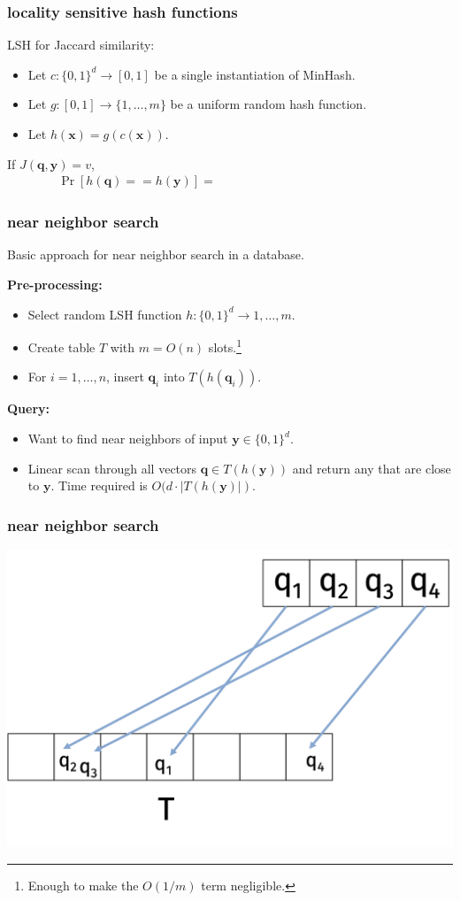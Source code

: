 \documentclass[compress]{beamer}
\newcommand{\bv}[1]{\mathbf{#1}}
\begin{document}
\begin{frame}
	\frametitle{locality sensitive hash functions}
	LSH for Jaccard similarity:
	\begin{itemize}
		\item Let $c: \{0,1\}^d \rightarrow [0,1]$ be a single instantiation of MinHash.
		\item Let $g: [0,1] \rightarrow \{1, \ldots, m\}$ be a uniform random hash function.
		\item Let $h(\bv{x}) = g(c(\bv{x})).$
	\end{itemize}
		If $J(\bv{q},\bv{y}) = v$, 
		\begin{align*}
			\Pr\left[h(\bv{q}) == h(\bv{y})\right] = \hspace{15em}
		\end{align*}
\end{frame}

\begin{frame}
	\frametitle{near neighbor search}
	\begin{center}
	Basic approach for near neighbor search in a database.
	\end{center}
		\textbf{Pre-processing:}
	\begin{itemize}
		\item Select random LSH function $h: \{0,1\}^d \rightarrow 1,\ldots, m$.
		\item Create table $T$ with $m = O(n)$ slots.\footnote{Enough to make the $O(1/m)$ term negligible.}
		\item For $i = 1,\ldots, n$, insert $\bv{q}_i$ into $T(h(\bv{q}_i))$.
	\end{itemize}
	\textbf{Query:}
	\begin{itemize}
		\item Want to find near neighbors of input $\bv{y}\in\{0,1\}^d$.
		\item Linear scan through all vectors $\bv{q}\in T(h(\bv{y}))$ and return any that are close to $\bv{y}$. Time required is $O(d\cdot |T(h(\bv{y})|)$.
	\end{itemize}
\vspace{1em}
\end{frame}

\begin{frame}
	\frametitle{near neighbor search}
	\begin{center}
		\includegraphics[width=.8\textwidth]{basicScheme.png}
	\end{center}
\end{frame}
\end{document}
